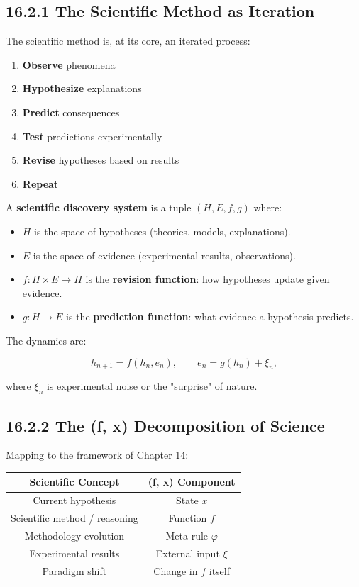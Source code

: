 \subsection{16.2.1 The Scientific Method as Iteration}

The scientific method is, at its core, an iterated process:

\begin{enumerate}
\item \textbf{Observe} phenomena
\item \textbf{Hypothesize} explanations
\item \textbf{Predict} consequences
\item \textbf{Test} predictions experimentally
\item \textbf{Revise} hypotheses based on results
\item \textbf{Repeat}
\end{enumerate}

\begin{definition}
A \textbf{scientific discovery system} is a tuple $(H, E, f, g)$ where:
\begin{itemize}
\item $H$ is the space of hypotheses (theories, models, explanations).
\item $E$ is the space of evidence (experimental results, observations).
\item $f: H \times E \to H$ is the \textbf{revision function}: how hypotheses update given evidence.
\item $g: H \to E$ is the \textbf{prediction function}: what evidence a hypothesis predicts.

\end{itemize}
The dynamics are:

\[h_{n+1} = f(h_n, e_n), \qquad e_n = g(h_n) + \xi_n,\]

where $\xi_n$ is experimental noise or the "surprise" of nature.
\end{definition}

\subsection{16.2.2 The (f, x) Decomposition of Science}

Mapping to the framework of Chapter 14:

\begin{center}
\begin{tabular}{cc}
\toprule
Scientific Concept & (f, x) Component \\
\midrule
Current hypothesis & State $x$ \\
Scientific method / reasoning & Function $f$ \\
Methodology evolution & Meta-rule $\varphi$ \\
Experimental results & External input $\xi$ \\
Paradigm shift & Change in $f$ itself \\
\bottomrule
\end{tabular}
\end{center}

